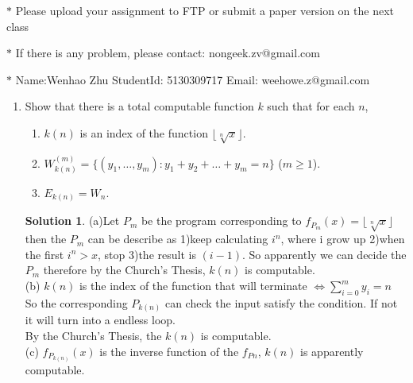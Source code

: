 \documentclass[12pt,a4paper]{article}
\theoremstyle{definition}
\newtheorem*{solution}{Solution}
\numberwithin{equation}{section}
\numberwithin{figure}{section}
\begin{document}
\noindent{}
\begin{center}
\footnotesize{\color{red}$*$ Please upload your assignment to FTP or submit a paper version on the next class}

\footnotesize{\color{red}$*$ If there is any problem, please contact: nongeek.zv@gmail.com }

\footnotesize{\color{blue}$*$ Name:Wenhao Zhu \quad StudentId: 5130309717 \quad Email: weehowe.z@gmail.com}
\end{center}


\begin{enumerate}%
  \item Show that there is a total computable function $k$ such that for each $n$,
    \begin{enumerate}
      \item $k(n)$ is an index of the function $\lfloor\sqrt[n]{x}\rfloor$.
      \item $W_{k(n)}^{(m)}=\{(y_{1},\ldots,y_{m}):y_{1}+y_{2}+\ldots+y_{m}=n\}$ ($m\geq 1$).
      \item $E_{k(n)}=W_n$.
    \end{enumerate}
    \begin{solution}
      (a)Let $P_{m}$ be the program corresponding to $f_{P_{m}}(x)=\lfloor\sqrt[n]{x}\rfloor$\\
      then the $P_{m}$ can be describe as 1)keep calculating $i^{n}$, where i grow up 2)when the first $i^{n} > x$, stop 3)the result is $(i-1)$. So apparently we can decide the $P_{m}$ therefore by the Church's Thesis, $k(n)$ is computable.\\
      (b) $k(n)$ is the index of the function that will terminate $\iff \sum\limits_{i=0}^{m}{y_{i}} = n$\\
      So the corresponding $P_{k(n)}$ can check the input satisfy the condition. If not it will turn into a endless loop.\\
      By the Church's Thesis, the $k(n)$ is computable.\\
      (c) $f_{P_{k(n)}}(x)$ is the inverse function of the $f_{P{n}}$, $k(n)$ is apparently computable.      
    \end{solution}


\end{enumerate}
\end{document}
